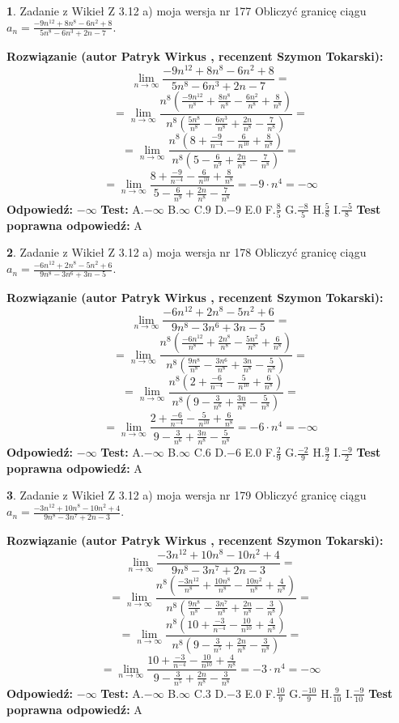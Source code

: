 \documentclass[12pt, a4paper]{article}
\theoremstyle{definition} %
\newtheorem{zad}{}
\newcommand{\zadStart}[1]{\begin{zad}#1\newline}
\newcommand{\zadStop}{\end{zad}}
\newcommand{\rozwStart}[2]{\noindent \textbf{Rozwiązanie (autor #1 , recenzent #2): }\newline}
\newcommand{\rozwStop}{\newline}
\newcommand{\odpStart}{\noindent \textbf{Odpowiedź:}\newline}
\newcommand{\odpStop}{\newline}
\newcommand{\testStart}{\noindent \textbf{Test:}\newline}
\newcommand{\testStop}{\newline}
\newcommand{\kluczStart}{\noindent \textbf{Test poprawna odpowiedź:}\newline}
\newcommand{\kluczStop}{\newline}
\begin{document}
\zadStart{Zadanie z Wikieł Z 3.12 a) moja wersja nr 177}
Obliczyć granicę ciągu $a_{n}=\frac{-9n^{12}+8n^{8}-6n^{2}+8}{5n^{8}-6n^{3}+2n-7}$.
\zadStop
\rozwStart{Patryk Wirkus}{Szymon Tokarski}
$$\lim\limits_{n\to\infty}\frac{-9n^{12}+8n^{8}-6n^{2}+8}{5n^{8}-6n^{3}+2n-7}=$$
$$=\lim\limits_{n\to\infty}\frac{n^{8}\left(\frac{-9n^{12}}{n^{8}}+\frac{8n^{8}}{n^{8}}-\frac{6n^{2}}{n^{8}}+\frac{8}{n^{8}}\right)}{n^{8}\left(\frac{5n^{8}}{n^{8}}-\frac{6n^{3}}{n^{8}}+\frac{2n}{n^{8}}-\frac{7}{n^{8}}\right)}=$$
$$=\lim\limits_{n\to\infty}\frac{n^{8}\left(8+\frac{-9}{n^{-4}}-\frac{6}{n^{10}}+\frac{8}{n^{8}}\right)}
{n^{8}\left(5-\frac{6}{n^{9}}+\frac{2n}{n^{8}}-\frac{7}{n^{8}}\right)}=$$
$$=\lim\limits_{n\to\infty}\frac{8+\frac{-9}{n^{-4}}-\frac{6}{n^{10}}+\frac{8}{n^{8}}}{5-\frac{6}{n^{9}}+\frac{2n}{n^{8}}-\frac{7}{n^{8}}}=-9\cdot n^{4} = -\infty$$
\rozwStop
\odpStart
$-\infty$
\odpStop
\testStart
A.$-\infty$
B.$\infty$
C.$9$
D.$-9$
E.$0$
F.$\frac{8}{5}$
G.$\frac{-8}{5}$
H.$\frac{5}{8}$
I.$\frac{-5}{8}$
\testStop
\kluczStart
A
\kluczStop



\zadStart{Zadanie z Wikieł Z 3.12 a) moja wersja nr 178}
Obliczyć granicę ciągu $a_{n}=\frac{-6n^{12}+2n^{8}-5n^{2}+6}{9n^{8}-3n^{6}+3n-5}$.
\zadStop
\rozwStart{Patryk Wirkus}{Szymon Tokarski}
$$\lim\limits_{n\to\infty}\frac{-6n^{12}+2n^{8}-5n^{2}+6}{9n^{8}-3n^{6}+3n-5}=$$
$$=\lim\limits_{n\to\infty}\frac{n^{8}\left(\frac{-6n^{12}}{n^{8}}+\frac{2n^{8}}{n^{8}}-\frac{5n^{2}}{n^{8}}+\frac{6}{n^{8}}\right)}{n^{8}\left(\frac{9n^{8}}{n^{8}}-\frac{3n^{6}}{n^{8}}+\frac{3n}{n^{8}}-\frac{5}{n^{8}}\right)}=$$
$$=\lim\limits_{n\to\infty}\frac{n^{8}\left(2+\frac{-6}{n^{-4}}-\frac{5}{n^{10}}+\frac{6}{n^{8}}\right)}
{n^{8}\left(9-\frac{3}{n^{6}}+\frac{3n}{n^{8}}-\frac{5}{n^{8}}\right)}=$$
$$=\lim\limits_{n\to\infty}\frac{2+\frac{-6}{n^{-4}}-\frac{5}{n^{10}}+\frac{6}{n^{8}}}{9-\frac{3}{n^{6}}+\frac{3n}{n^{8}}-\frac{5}{n^{8}}}=-6\cdot n^{4} = -\infty$$
\rozwStop
\odpStart
$-\infty$
\odpStop
\testStart
A.$-\infty$
B.$\infty$
C.$6$
D.$-6$
E.$0$
F.$\frac{2}{9}$
G.$\frac{-2}{9}$
H.$\frac{9}{2}$
I.$\frac{-9}{2}$
\testStop
\kluczStart
A
\kluczStop



\zadStart{Zadanie z Wikieł Z 3.12 a) moja wersja nr 179}
Obliczyć granicę ciągu $a_{n}=\frac{-3n^{12}+10n^{8}-10n^{2}+4}{9n^{8}-3n^{7}+2n-3}$.
\zadStop
\rozwStart{Patryk Wirkus}{Szymon Tokarski}
$$\lim\limits_{n\to\infty}\frac{-3n^{12}+10n^{8}-10n^{2}+4}{9n^{8}-3n^{7}+2n-3}=$$
$$=\lim\limits_{n\to\infty}\frac{n^{8}\left(\frac{-3n^{12}}{n^{8}}+\frac{10n^{8}}{n^{8}}-\frac{10n^{2}}{n^{8}}+\frac{4}{n^{8}}\right)}{n^{8}\left(\frac{9n^{8}}{n^{8}}-\frac{3n^{7}}{n^{8}}+\frac{2n}{n^{8}}-\frac{3}{n^{8}}\right)}=$$
$$=\lim\limits_{n\to\infty}\frac{n^{8}\left(10+\frac{-3}{n^{-4}}-\frac{10}{n^{10}}+\frac{4}{n^{8}}\right)}
{n^{8}\left(9-\frac{3}{n^{5}}+\frac{2n}{n^{8}}-\frac{3}{n^{8}}\right)}=$$
$$=\lim\limits_{n\to\infty}\frac{10+\frac{-3}{n^{-4}}-\frac{10}{n^{10}}+\frac{4}{n^{8}}}{9-\frac{3}{n^{5}}+\frac{2n}{n^{8}}-\frac{3}{n^{8}}}=-3\cdot n^{4} = -\infty$$
\rozwStop
\odpStart
$-\infty$
\odpStop
\testStart
A.$-\infty$
B.$\infty$
C.$3$
D.$-3$
E.$0$
F.$\frac{10}{9}$
G.$\frac{-10}{9}$
H.$\frac{9}{10}$
I.$\frac{-9}{10}$
\testStop
\kluczStart
A
\kluczStop
\end{document}
